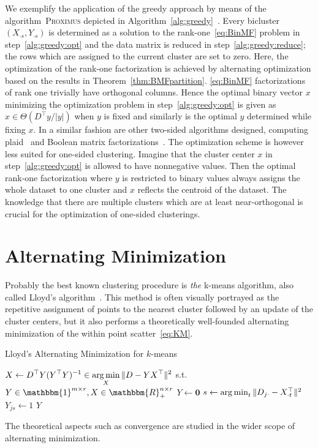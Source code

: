 We exemplify the application of the greedy approach by means of the algorithm~\textsc{Proximus} depicted in Algorithm~\ref{alg:greedy}~\citep{koyuturk2003proximus}. Every bicluster $(X_{\cdot s},Y_{\cdot s})$ is determined as a solution to the rank-one~\ref{eq:BinMF} problem in step~\ref{alg:greedy:opt} and the data matrix is reduced in step~\ref{alg:greedy:reduce}; the rows which are assigned to the current cluster are set to zero. Here, the optimization of the rank-one factorization is achieved by alternating optimization based on the results in Theorem~\ref{thm:BMFpartition}. \ref{eq:BinMF} factorizations of rank one trivially have orthogonal columns. Hence the optimal binary vector $x$ minimizing the optimization problem in step~\ref{alg:greedy:opt} is given as $x\in\Theta(D^\top y/|y|)$ when $y$ is fixed and similarly is the optimal $y$ determined while fixing $x$. In a similar fashion are other two-sided algorithms designed, computing plaid~\citep{cheng2000biclustering, lazzeroni2002plaid,turner2005improved} and Boolean matrix factorizations~\citep{miettinen2008discrete, geerts2004tiling}. The optimization scheme is however less suited for  one-sided clustering. Imagine that the cluster center $x$ in step~\ref{alg:greedy:opt} is allowed to have nonnegative values. Then the optimal rank-one factorization where $y$ is restricted to binary values always assigns the whole dataset to one cluster and $x$ reflects the centroid of the dataset. The knowledge that there are multiple clusters which are at least near-orthogonal is crucial for the optimization of one-sided clusterings.
\section{Alternating Minimization}\label{sec:ZS:Lloyds}
Probably the best known clustering procedure is \emph{the} k-means algorithm, also called Lloyd's algorithm~\citep{lloyd1982least}. This method is often visually portrayed as the repetitive assignment of points to the nearest cluster followed by an update of the cluster centers, but it also performs a theoretically well-founded alternating minimization of the within point scatter~\eqref{eq:KM}.
\begin{algorithm}[t]
\caption{Lloyd's Alternating Minimization for $k$-means} 
\begin{algorithmic}[1]
    \State $\displaystyle X \gets D^\top Y(Y^\top Y)^{-1} \in  \operatorname*{arg\,min}_{X}\|D-YX^\top\|^2$ s.t. $Y\in\mathbbm{1}^{m\times r},X\in\mathbbm{R}_+^{n\times r}$
    \State $Y\gets \mathbf{0}$
        \State $s\gets \operatorname*{arg\,min}_t\|D_{j\cdot}-X_{\cdot t}^\top\|^2$ \label{alg:lloyd:y}
        \State $Y_{js}\gets 1$
    \EndFor
\EndFor
  \State \Return $Y$
  \EndFunction
\end{algorithmic}
\label{alg:lloyd}
\end{algorithm}
The theoretical aspects such as convergence are studied in the wider scope of alternating minimization. 

